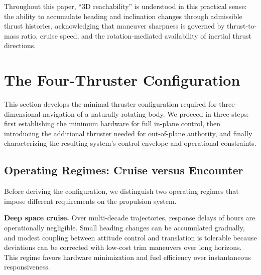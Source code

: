 \documentclass{article}
\begin{document}
Throughout this paper, ``3D reachability'' is understood in this practical sense: the ability to accumulate heading and inclination changes through admissible thrust histories, acknowledging that maneuver sharpness is governed by thrust-to-mass ratio, cruise speed, and the rotation-mediated availability of inertial thrust directions.



\section{The Four-Thruster Configuration}
\label{sec:config}

This section develops the minimal thruster configuration required for three-dimensional navigation of a naturally rotating body. We proceed in three steps: first establishing the minimum hardware for full in-plane control, then introducing the additional thruster needed for out-of-plane authority, and finally characterizing the resulting system's control envelope and operational constraints. 

\subsection{Operating Regimes: Cruise versus Encounter}
\label{sec:cruise_encounter_regimes}

Before deriving the configuration, we distinguish two operating regimes that impose different requirements on the propulsion system.

\textbf{Deep space cruise.} Over multi-decade trajectories, response delays of hours are operationally negligible. Small heading changes can be accumulated gradually, and modest coupling between attitude control and translation is tolerable because deviations can be corrected with low-cost trim maneuvers over long horizons. This regime favors hardware minimization and fuel efficiency over instantaneous responsiveness.
\end{document}
